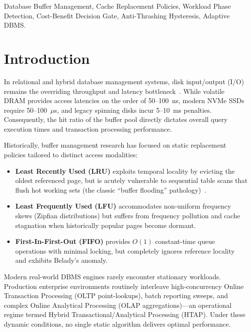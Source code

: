 \documentclass[conference]{IEEEtran}
\begin{document}
\begin{IEEEkeywords}
Database Buffer Management, Cache Replacement Policies, Workload Phase Detection, Cost-Benefit Decision Gate, Anti-Thrashing Hysteresis, Adaptive DBMS.
\end{IEEEkeywords}

\section{Introduction}
In relational and hybrid database management systems, disk input/output (I/O) remains the overriding throughput and latency bottleneck~\cite{stonebraker1981operating}. While volatile DRAM provides access latencies on the order of 50--100~ns, modern NVMe SSDs require 50--100~$\mu$s, and legacy spinning disks incur 5--10~ms penalties. Consequently, the hit ratio of the buffer pool directly dictates overall query execution times and transaction processing performance.

Historically, buffer management research has focused on static replacement policies tailored to distinct access modalities:
\begin{itemize}
    \item \textbf{Least Recently Used (LRU)} exploits temporal locality by evicting the oldest referenced page, but is acutely vulnerable to sequential table scans that flush hot working sets (the classic ``buffer flooding'' pathology)~\cite{belady1966study}.
    \item \textbf{Least Frequently Used (LFU)} accommodates non-uniform frequency skews (Zipfian distributions) but suffers from frequency pollution and cache stagnation when historically popular pages become dormant.
    \item \textbf{First-In-First-Out (FIFO)} provides $O(1)$ constant-time queue operations with minimal locking, but completely ignores reference locality and exhibits Belady's anomaly.
\end{itemize}

Modern real-world DBMS engines rarely encounter stationary workloads. Production enterprise environments routinely interleave high-concurrency Online Transaction Processing (OLTP point-lookups), batch reporting sweeps, and complex Online Analytical Processing (OLAP aggregations)---an operational regime termed Hybrid Transactional/Analytical Processing (HTAP). Under these dynamic conditions, no single static algorithm delivers optimal performance.
\end{document}
